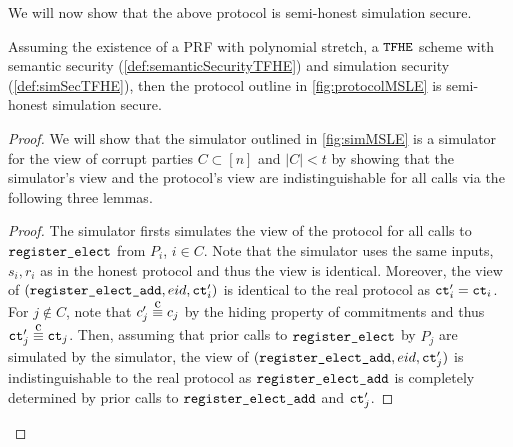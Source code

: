 \newcommand{\simCMSLE}{\texttt{Sim}_C}

We will now show that the above protocol is semi-honest simulation secure.

\begin{theorem}
	Assuming the existence of a PRF with polynomial stretch, a ${\texttt{TFHE}}$ scheme with semantic security (\cref{def:semanticSecurityTFHE}) and simulation security (\cref{def:simSecTFHE}),
	then the protocol outline in \cref{fig:protocolMSLE} is semi-honest simulation secure.
	\begin{proof}
		We will show that the simulator outlined in \cref{fig:simMSLE} is a simulator for the view of corrupt
		parties $C \subset [n]$ and $|C| < t$ by showing that the simulator's view and the protocol's view are indistinguishable for all calls
		via the following three lemmas.

		\begin{lemma}
			\begin{proof}
				The simulator firsts simulates the view of the protocol for all calls to $\texttt{register\_elect}$ from $P_i$, $i \in C$.
				Note that the simulator uses the same inputs, $s_i, r_i$ as in the honest protocol and thus the view is identical.
				Moreover, the view of $(\texttt{register\_elect\_add}, {eid}, \texttt{ct}'_i)$ is identical to the real protocol as $\texttt{ct}'_i = \texttt{ct}_i$.
				For $j \notin C$, note that $c'_j \compInd c_j$ by the hiding property of commitments and thus
				$\ct'_j \compInd \ct_j$.
				Then, assuming that prior calls to $\texttt{register\_elect}$ by $P_j$ are simulated by the simulator,
				the view of $(\texttt{register\_elect\_add}, {eid}, \texttt{ct}'_j)$ is indistinguishable to the real protocol as
				$\texttt{register\_elect\_add}$ is completely determined by prior calls to $\texttt{register\_elect\_add}$ and $\texttt{ct}'_j$.


\end{proof}
\end{lemma}
\end{proof}
\end{theorem}
